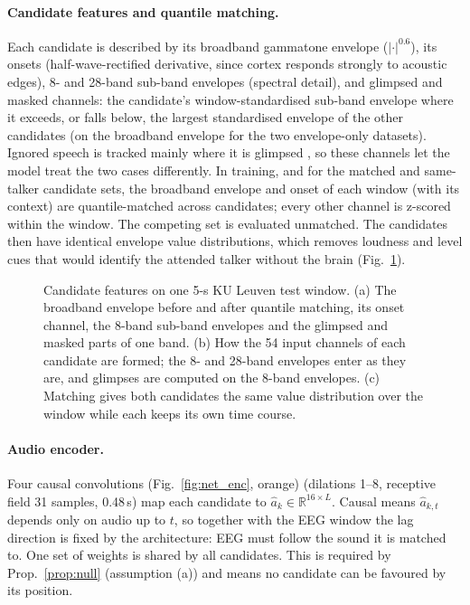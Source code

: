 \documentclass[twoside]{article}
\begin{document}
\paragraph{Candidate features and quantile matching.} Each candidate is described by its
broadband gammatone envelope ($|\cdot|^{0.6}$), its onsets (half-wave-rectified
derivative, since cortex responds strongly to acoustic edges), 8- and 28-band sub-band
envelopes (spectral detail), and glimpsed and masked channels: the candidate's window-standardised
sub-band envelope where it exceeds, or falls below, the largest standardised envelope of the
other candidates (on the broadband envelope for the two envelope-only datasets). Ignored speech is tracked mainly
where it is glimpsed \citep{brodbeck2020neural}, so these channels let the model treat
the two cases differently. In training, and for the matched and same-talker candidate sets, the broadband envelope
and onset of each window (with its context) are quantile-matched across candidates; every
other channel is z-scored within the window. The competing set is evaluated unmatched. The candidates
then have identical envelope value distributions, which removes loudness and level cues that
would identify the attended talker without the brain (Fig.~\ref{fig:net_feat}).

\begin{figure}[t]\centering
\resizebox{\textwidth}{!}{}
\caption{Candidate features on one 5-s KU Leuven test window. (a) The broadband envelope
before and after quantile matching, its onset channel, the 8-band sub-band envelopes and the
glimpsed and masked parts of one band. (b) How the 54 input channels of each candidate are
formed; the 8- and 28-band envelopes enter as they are, and glimpses are computed on the
8-band envelopes. (c) Matching gives both candidates the same value distribution over the
window while each keeps its own time course.}\label{fig:net_feat}
\end{figure}

\paragraph{Audio encoder.} Four causal convolutions (Fig.~\ref{fig:net_enc}, orange) (dilations 1--8, receptive field 31
samples, 0.48\,s) map each candidate to $\hat{a}_k\in\mathbb R^{16\times L}$. Causal
means $\hat a_{k,t}$ depends only on audio up to $t$, so together with the EEG window the
lag direction is fixed by the architecture: EEG must follow the sound it is matched to. One
set of weights is shared by all candidates. This is required by Prop.~\ref{prop:null}
(assumption (a)) and means no candidate can be favoured by its position.
\end{document}
